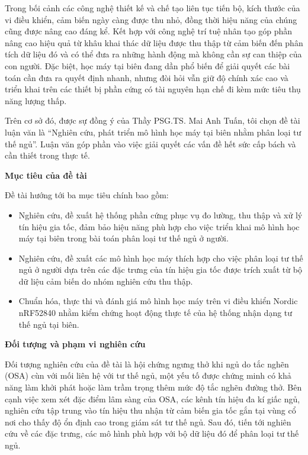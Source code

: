 Trong bối cảnh các công nghệ thiết kế và chế tạo liên tục tiến bộ, kích thước
của vi điều khiển, cảm biến ngày càng được thu nhỏ, đồng thời hiệu năng của
chúng cũng được nâng cao đáng kể. Kết hợp với công nghệ trí tuệ nhân tạo góp
phần nâng cao hiệu quả từ khâu khai thác dữ liệu được thu thập từ cảm biến đến
phân tích dữ liệu đó và có thể đưa ra những hành động mà không cần sự can thiệp
của con người. Đặc biệt, học máy tại biên đang dần phổ biến để giải quyết các
bài toán cần đưa ra quyết định nhanh, nhưng đòi hỏi vẫn giữ độ chính xác cao và
triển khai trên các thiết bị phần cứng có tài nguyên hạn chế đi kèm mức tiêu
thụ năng lượng thấp.

Trên cơ sở đó, được sự đồng ý của Thầy PSG.TS. Mai Anh Tuấn, tôi chọn đề tài
luận văn là “Nghiên cứu, phát triển mô hình học máy tại biên nhằm phân loại tư
thế ngủ”. Luận văn góp phần vào việc giải quyết các vấn đề hết sức cấp bách và
cần thiết trong thực tế.

\noindent\textbf{Mục tiêu của đề tài}

Đề tài hướng tới ba mục tiêu chính bao gồm:
\begin{itemize}
  \item Nghiên cứu, đề xuất hệ thống phần cứng phục vụ đo lường, thu thập và xử lý tín
        hiệu gia tốc, đảm bảo hiệu năng phù hợp cho việc triển khai mô hình học máy tại
        biên trong bài toán phân loại tư thế ngủ ở người.

  \item Nghiên cứu, đề xuất các mô hình học máy thích hợp cho việc phân loại tư thế ngủ
        ở người dựa trên các đặc trưng của tín hiệu gia tốc được trích xuất từ bộ dữ
        liệu cảm biến do nhóm nghiên cứu thu thập.

  \item Chuẩn hóa, thực thi và đánh giá mô hình học máy trên vi điều khiển Nordic
        nRF52840 nhằm kiểm chứng hoạt động thực tế của hệ thống nhận dạng tư thế ngủ
        tại biên.
\end{itemize}

\noindent\textbf{Đối tượng và phạm vi nghiên cứu}

Đối tượng nghiên cứu của đề tài là hội chứng ngưng thở khi ngủ do tắc nghẽn (OSA)
cùn với mối liên hệ với tư thế ngủ, một yếu tố được chứng minh có khả năng làm
khởi phát hoặc làm trầm trọng thêm mức độ tắc nghẽn đường thở.
Bên cạnh việc xem xét đặc điểm lâm sàng của OSA, các kênh tín hiệu đa kí giấc ngủ,
nghiên cứu tập trung
vào tín hiệu thu nhận từ cảm biến
gia tốc gắn tại vùng cổ nơi cho thấy độ ổn định
cao trong giám sát tư thế ngủ.
Sau đó, tiến tới nghiên cứu về các đặc trưng, các mô hình phù hợp với bộ dữ liệu đó để phân loại tư thế ngủ.


